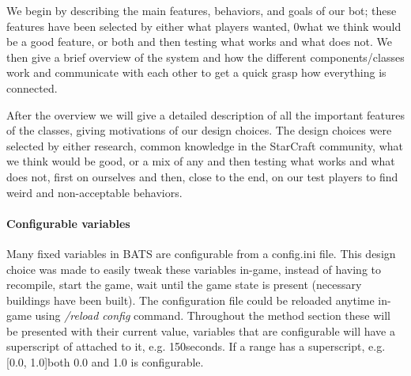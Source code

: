 
We begin by describing the main features, behaviors, and goals of our bot; these features have been selected by either what players wanted, 0what we think would be a good feature, or both and then testing what works and what does not. We then give a brief overview of the system and how the different components/classes work and communicate with each other to get a quick grasp how everything is connected.

After the overview we will give a detailed description of all the important features of the classes, giving motivations of our design choices. The design choices were selected by either research, common knowledge in the StarCraft community, what we think would be good, or a mix of any and then testing what works and what does not, first on ourselves and then, close to the end, on our test players to find weird and non-acceptable behaviors.

\paragraph{Configurable variables}
Many fixed variables in BATS are configurable from a config.ini file. This design choice was made to easily tweak these variables in-game, instead of having to recompile, start the game, wait until the game state is present (necessary buildings have been built). The configuration file could be reloaded anytime in-game using \emph{/reload config} command. Throughout the method section these will be presented with their current value, variables that are configurable will have a superscript of \conf attached to it, e.g. 150\conf seconds. If a range has a superscript, e.g. [0.0, 1.0]\conf both 0.0 and 1.0 is configurable.